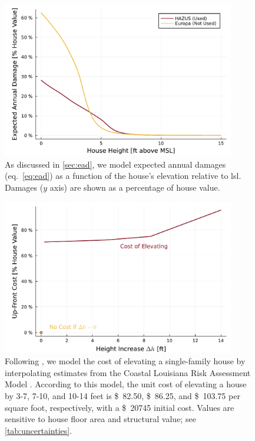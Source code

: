 \documentclass[12pt]{article}
\newcommand{\usd}[1]{\SI{#1}[\$]{}}
\begin{document}
\begin{figure}
    \centering
    \includegraphics[width=4in]{cost-expected-damage-emulator}
    \caption{
        As discussed in \cref{sec:ead}, we model expected annual damages (eq.~\ref{eq:ead}) as a function of the house's elevation relative to \gls{lsl}.
        Damages ($y$ axis) are shown as a percentage of house value.
    }\label{fig:cost-expected-damage-emulator}
\end{figure}

\begin{figure}
    \centering
    \includegraphics[width=4in]{cost-up-front}
    \caption{
        Following \citet{zarekarizi_suboptimal:2020}, we model the cost of elevating a single-family house by interpolating estimates from the Coastal Louisiana Risk Assessment Model \citep{johnson_clara:2013}.
        According to this model, the unit cost of elevating a house by 3-7, 7-10, and 10-14 feet is \usd{82.50}, \usd{86.25}, and \usd{103.75} per square foot, respectively, with a \usd{20745} initial cost.
        Values are sensitive to house floor area and structural value; see \cref{tab:uncertainties}.
    }\label{fig:cost-up-front}
\end{figure}
\end{document}
